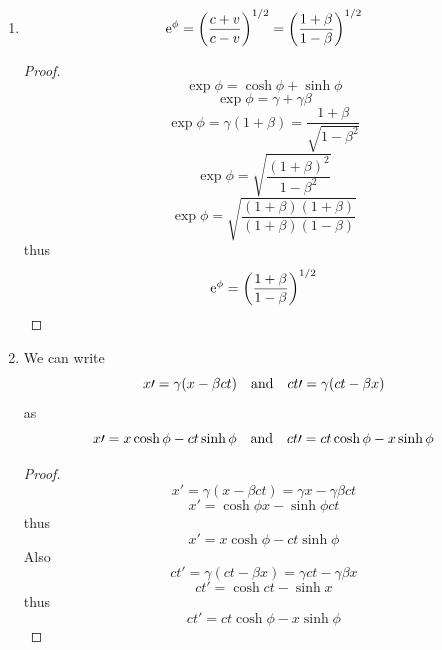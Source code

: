 \documentclass[oneside, 10pt, notitlepage]{book}
\begin{document}
\begin{enumerate}
    \item \begin{equation}\text{e}^{\phi} = \left(\frac{c+v}{c-v}\right)^{1/2} = \left(\frac{1+\beta}{1-\beta}\right)^{1/2}\end{equation}
        \begin{proof}
        	\begin{equation}\exp{\phi} = \cosh \phi + \sinh \phi \end{equation}
        	\begin{equation}\exp{\phi} = \gamma + \gamma \beta \end{equation}
        	\begin{equation}\exp{\phi} = \gamma(1+\beta) = \frac{1+\beta}{\sqrt{1-\beta^2}}\end{equation}
        	\begin{equation}\exp{\phi} = \sqrt{ \frac{(1+\beta)^2}{1-\beta^2} }\end{equation}
        	\begin{equation}\exp{\phi} = \sqrt{ \frac{(1+\beta)(1+\beta)}{(1+\beta)(1-\beta)}  }\end{equation}
        	thus
        	\begin{equation}\text{e}^{\phi} = \left(\frac{1+\beta}{1-\beta}\right)^{1/2}\end{equation}
        \end{proof}
        
        
        
    \item We can write
        \begin{equation}x{\prime}= \gamma (x - \beta ct) \qq{and} ct{\prime} = \gamma (ct - \beta x)\end{equation}
        as
        \begin{equation}x{\prime}= x \cosh \phi - ct \sinh \phi \qq{and} ct{\prime} = ct \cosh \phi - x \sinh \phi\end{equation}
        \begin{proof}
        	\begin{equation}x{\prime}= \gamma (x - \beta ct) = \gamma x - \gamma \beta ct\end{equation}
            \begin{equation}x{\prime}= \cosh \phi x - \sinh \phi ct\end{equation}
            thus
            \begin{equation}x{\prime}= x \cosh \phi - ct \sinh \phi\end{equation}
            Also
            \begin{equation}ct{\prime} = \gamma (ct - \beta x) = \gamma ct - \gamma \beta x\end{equation}
            \begin{equation}ct{\prime} = \cosh ct - \sinh x\end{equation}
            thus
            \begin{equation}ct{\prime} = ct \cosh \phi - x \sinh \phi\end{equation}
        \end{proof}
        

\end{enumerate}
\end{document}
